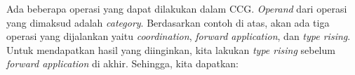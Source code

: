 Ada beberapa operasi yang dapat dilakukan dalam CCG. \textit{Operand} dari operasi
yang dimaksud adalah \textit{category}. Berdasarkan contoh di atas, akan ada tiga
operasi yang dijalankan yaitu \textit{coordination}, \textit{forward application},
dan \textit{type rising}.
Untuk mendapatkan hasil yang diinginkan, kita lakukan \textit{type rising} sebelum
\textit{forward application} di akhir.
Sehingga, kita dapatkan:


